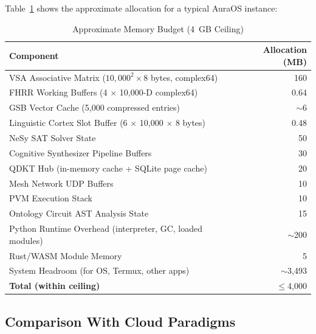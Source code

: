 \documentclass[11pt]{article}
\begin{document}
Table~\ref{tab:memory} shows the approximate allocation for a typical AuraOS instance:

\begin{table}[H]
\centering
\caption{Approximate Memory Budget (4~GB Ceiling)}
\label{tab:memory}
\begin{tabular}{lr}
\toprule
\textbf{Component} & \textbf{Allocation (MB)} \\
\midrule
VSA Associative Matrix ($10{,}000^2 \times 8$ bytes, complex64) & 160 \\
FHRR Working Buffers (4 $\times$ 10,000-D complex64) & 0.64 \\
GSB Vector Cache (5,000 compressed entries) & $\sim$6 \\
Linguistic Cortex Slot Buffer (6 $\times$ 10,000 $\times$ 8 bytes) & 0.48 \\
NeSy SAT Solver State & 50 \\
Cognitive Synthesizer Pipeline Buffers & 30 \\
QDKT Hub (in-memory cache + SQLite page cache) & 20 \\
Mesh Network UDP Buffers & 10 \\
PVM Execution Stack & 10 \\
Ontology Circuit AST Analysis State & 15 \\
Python Runtime Overhead (interpreter, GC, loaded modules) & $\sim$200 \\
Rust/WASM Module Memory & 5 \\
System Headroom (for OS, Termux, other apps) & $\sim$3,493 \\
\midrule
\textbf{Total (within ceiling)} & $\leq$4,000 \\
\bottomrule
\end{tabular}
\end{table}

\subsection{Comparison With Cloud Paradigms}
\end{document}
